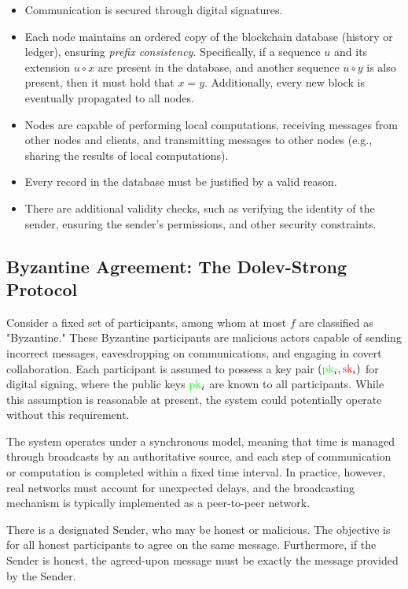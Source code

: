 \begin{itemize}
    \item Communication is secured through digital signatures.
    \item Each node maintains an ordered copy of the blockchain database (history or ledger), ensuring \emph{prefix consistency}. 
    Specifically, if a sequence $u$ and its extension $u \circ x$ are present in the database, and another sequence $u \circ y$ is also present, then it must hold that $x = y$. 
    Additionally, every new block is eventually propagated to all nodes.
    \item Nodes are capable of performing local computations, receiving messages from other nodes and clients, and transmitting messages to other nodes (e.g., sharing the results of local computations).
    \item Every record in the database must be justified by a valid reason.
    \item There are additional validity checks, such as verifying the identity of the sender, ensuring the sender's permissions, and other security constraints.
\end{itemize}

\subsection{Byzantine Agreement: The Dolev-Strong Protocol}

Consider a fixed set of participants, among whom at most $f$ are classified as "Byzantine." 
These Byzantine participants are malicious actors capable of sending incorrect messages, eavesdropping on communications, and engaging in covert collaboration. 
Each participant is assumed to possess a key pair $(\textcolor{green}{\text{pk}}_i, \textcolor{red}{\text{sk}}_i)$ for digital signing, where the public keys $\textcolor{green}{\text{pk}}_i$ are known to all participants. 
While this assumption is reasonable at present, the system could potentially operate without this requirement. 

The system operates under a synchronous model, meaning that time is managed through broadcasts by an authoritative source, and each step of communication or computation is completed within a fixed time interval. 
In practice, however, real networks must account for unexpected delays, and the broadcasting mechanism is typically implemented as a peer-to-peer network.


\begin{problem}
    There is a designated Sender, who may be honest or malicious. 
    The objective is for all honest participants to agree on the same message. 
    Furthermore, if the Sender is honest, the agreed-upon message must be exactly the message provided by the Sender.
\end{problem}

